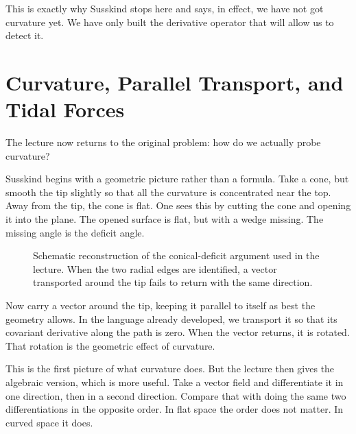 This is exactly why Susskind stops here and says, in effect, we have not got curvature yet. We have only built the derivative operator that will allow us to detect it.

\section{Curvature, Parallel Transport, and Tidal Forces}

The lecture now returns to the original problem: how do we actually probe curvature?

Susskind begins with a geometric picture rather than a formula. Take a cone, but smooth the tip slightly so that all the curvature is concentrated near the top. Away from the tip, the cone is flat. One sees this by cutting the cone and opening it into the plane. The opened surface is flat, but with a wedge missing. The missing angle is the deficit angle.

\begin{figure}[h]
\centering
{}
\caption{Schematic reconstruction of the conical-deficit argument used in the lecture. When the two radial edges are identified, a vector transported around the tip fails to return with the same direction.}
\end{figure}

Now carry a vector around the tip, keeping it parallel to itself as best the geometry allows. In the language already developed, we transport it so that its covariant derivative along the path is zero. When the vector returns, it is rotated. That rotation is the geometric effect of curvature.

This is the first picture of what curvature does. But the lecture then gives the algebraic version, which is more useful. Take a vector field and differentiate it in one direction, then in a second direction. Compare that with doing the same two differentiations in the opposite order. In flat space the order does not matter. In curved space it does.

